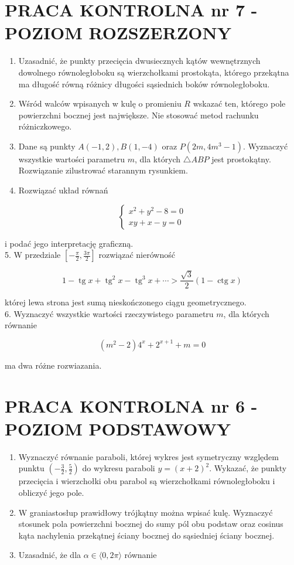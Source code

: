 \documentclass[10pt]{article}
\begin{document}
\section*{PRACA KONTROLNA nr 7 - POZIOM ROZSZERZONY}
\begin{enumerate}
  \item Uzasadnić, że punkty przecięcia dwusiecznych kątów wewnętrznych dowolnego równoległoboku są wierzchołkami prostokąta, którego przekątna ma długość równą różnicy długości sąsiednich boków równoległoboku.
  \item Wśród walców wpisanych w kulę o promieniu $R$ wskazać ten, którego pole powierzchni bocznej jest największe. Nie stosować metod rachunku różniczkowego.
  \item Dane są punkty $A(-1,2), B(1,-4)$ oraz $P\left(2 m, 4 m^{3}-1\right)$. Wyznaczyć wszystkie wartości parametru $m$, dla których $\triangle A B P$ jest prostokątny. Rozwiązanie zilustrować starannym rysunkiem.
  \item Rozwiązać układ równań
\end{enumerate}

$$
\left\{\begin{array}{l}
x^{2}+y^{2}-8=0 \\
x y+x-y=0
\end{array}\right.
$$

i podać jego interpretację graficzną.\\
5. W przedziale $\left[-\frac{\pi}{2}, \frac{3 \pi}{2}\right]$ rozwiązać nierówność

$$
1-\operatorname{tg} x+\operatorname{tg}^{2} x-\operatorname{tg}^{3} x+\cdots>\frac{\sqrt{3}}{2}(1-\operatorname{ctg} x)
$$

której lewa strona jest sumą nieskończonego ciągu geometrycznego.\\
6. Wyznaczyć wszystkie wartości rzeczywistego parametru $m$, dla których równanie

$$
\left(m^{2}-2\right) 4^{x}+2^{x+1}+m=0
$$

ma dwa różne rozwiazania.

\section*{PRACA KONTROLNA nr 6 - POZIOM PODSTAWOWY}
\begin{enumerate}
  \item Wyznaczyć równanie paraboli, której wykres jest symetryczny względem punktu $\left(-\frac{3}{2}, \frac{5}{2}\right)$ do wykresu paraboli $y=(x+2)^{2}$. Wykazać, że punkty przecięcia i wierzchołki obu parabol są wierzchołkami równoległoboku i obliczyć jego pole.
  \item W graniastosłup prawidłowy trójkątny można wpisać kulę. Wyznaczyć stosunek pola powierzchni bocznej do sumy pól obu podstaw oraz cosinus kąta nachylenia przekątnej ściany bocznej do sąsiedniej ściany bocznej.
  \item Uzasadnić, że dla $\alpha \in\langle 0,2 \pi\rangle$ równanie
\end{enumerate}
\end{document}
